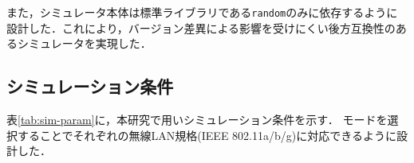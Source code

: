 \documentclass[a4paper, 10pt]{ltjsarticle}
\begin{document}
また，シミュレータ本体は標準ライブラリである\texttt{random}のみに依存するように設計した．これにより，バージョン差異による影響を受けにくい後方互換性のあるシミュレータを実現した．




\vspace{-0.5em}

\subsection{シミュレーション条件}
表\ref{tab:sim-param}に，本研究で用いシミュレーション条件を示す．
モードを選択することでそれぞれの無線LAN規格(IEEE 802.11a/b/g)に対応できるように設計した．
\end{document}
